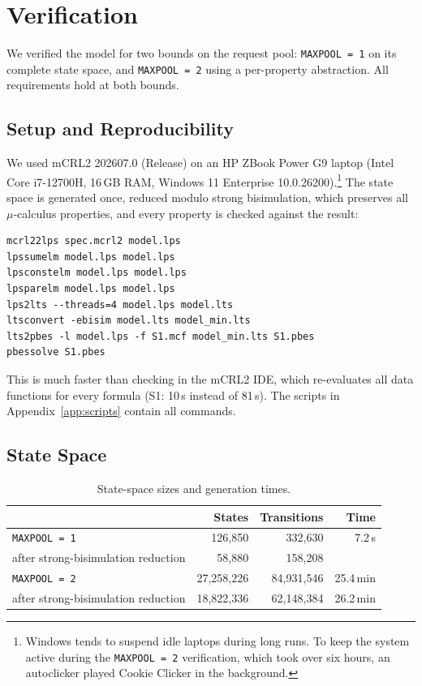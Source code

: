 \section{Verification}
\label{sec:verification}

We verified the model for two bounds on the request pool: \texttt{MAXPOOL = 1} on its complete state space, and \texttt{MAXPOOL = 2} using a per-property abstraction. All requirements hold at both bounds.

\subsection{Setup and Reproducibility}
\label{subsec:setup}

We used mCRL2 202607.0 (Release) on an HP ZBook Power G9 laptop (Intel Core i7-12700H, 16\,GB RAM, Windows 11 Enterprise 10.0.26200).\footnote{Windows tends to suspend idle laptops during long runs. To keep the system active during the \texttt{MAXPOOL = 2} verification, which took over six hours, an autoclicker played Cookie Clicker in the background.} The state space is generated once, reduced modulo strong bisimulation, which preserves all \(\mu\)-calculus properties, and every property is checked against the result:

\begin{lstlisting}
mcrl22lps spec.mcrl2 model.lps
lpssumelm model.lps model.lps
lpsconstelm model.lps model.lps
lpsparelm model.lps model.lps
lps2lts --threads=4 model.lps model.lts
ltsconvert -ebisim model.lts model_min.lts
lts2pbes -l model.lps -f S1.mcf model_min.lts S1.pbes
pbessolve S1.pbes
\end{lstlisting}

This is much faster than checking in the mCRL2 IDE, which re-evaluates all data functions for every formula (S1: 10\,s instead of 81\,s). The scripts in Appendix~\ref{app:scripts} contain all commands.

\subsection{State Space}
\label{subsec:state-space}

\begin{table}[htbp]
\centering
\small
\begin{tabular}{@{}lrrr@{}}
\toprule
 & States & Transitions & Time\\
\midrule
\texttt{MAXPOOL = 1} & 126,850 & 332,630 & 7.2\,s\\
\quad after strong-bisimulation reduction & 58,880 & 158,208 & \\
\texttt{MAXPOOL = 2} & 27,258,226 & 84,931,546 & 25.4\,min\\
\quad after strong-bisimulation reduction & 18,822,336 & 62,148,384 & 26.2\,min\\
\bottomrule
\end{tabular}
\caption{State-space sizes and generation times.}
\label{tab:state-space}
\end{table}

